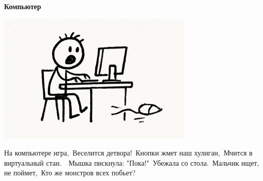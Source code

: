 \vspace*{\fill}
\begin{center}
  {\huge\textbf{Компьютер}}

  \vspace{1.5em}  \includegraphics[width=0.7\textwidth]{pictures/computer.png}
  \vspace{4em}
  \parbox{0.6\textwidth}{
    \LARGE
    \begin{spacing}{1.2}
      На компьютере игра,\
      Веселится детвора!\
      Кнопки жмет наш хулиган,\
      Мчится в виртуальный стан.\
      \
      Мышка пискнула: "Пока!"\
      Убежала со стола.\
      Мальчик ищет, не поймет,\
      Кто же монстров всех побьет?%
    \end{spacing}
      
  }
\end{center}
\vspace*{\fill}